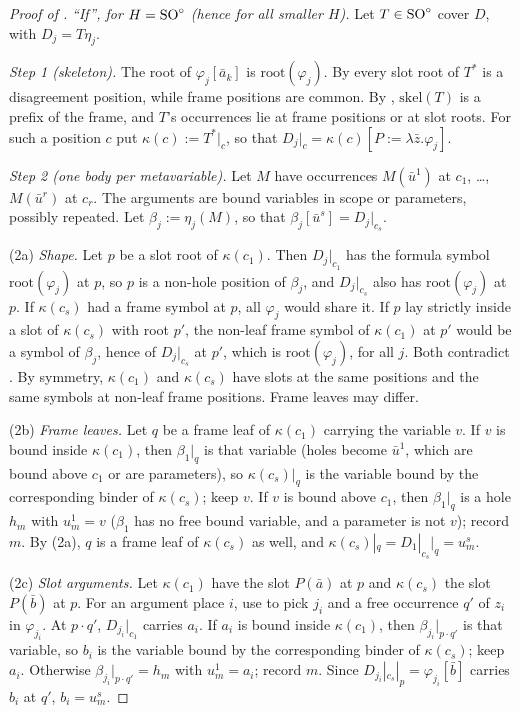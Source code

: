 \begin{proof}[Proof of ]
\emph{``If'', for $H=\mathrm{SO}^{\circ}$ (hence for all smaller $H$).} Let $T\in\mathrm{SO}^{\circ}$ cover $D$, with $D_j=T\eta_j$.

\emph{Step 1 (skeleton).} The root of $\varphi_j[\bar a_k]$ is $\mathrm{root}(\varphi_j)$. By \evR{} every slot root of
$T^*$ is a disagreement position, while frame positions are common. By , $\mathrm{skel}(T)$ is a
prefix of the frame, and $T$'s occurrences lie at frame positions or at slot roots. For such a position $c$ put
$\kappa(c):=T^*|_c$, so that $D_j|_c=\kappa(c)[P:=\lambda\bar z.\varphi_j]$.

\emph{Step 2 (one body per metavariable).} Let $M$ have occurrences $M(\bar u^1)$ at $c_1$, \dots, $M(\bar u^r)$ at
$c_r$. The arguments are bound variables in scope or parameters, possibly repeated. Let $\beta_j:=\eta_j(M)$, so that
$\beta_j[\bar u^s]=D_j|_{c_s}$.

(2a) \emph{Shape.} Let $p$ be a slot root of $\kappa(c_1)$. Then $D_j|_{c_1}$ has the formula symbol
$\mathrm{root}(\varphi_j)$ at $p$, so $p$ is a non-hole position of $\beta_j$, and $D_j|_{c_s}$ also has
$\mathrm{root}(\varphi_j)$ at $p$. If $\kappa(c_s)$ had a frame symbol at $p$, all $\varphi_j$ would share it. If $p$
lay strictly inside a slot of $\kappa(c_s)$ with root $p'$, the non-leaf frame symbol of $\kappa(c_1)$ at $p'$ would be a
symbol of $\beta_j$, hence of $D_j|_{c_s}$ at $p'$, which is $\mathrm{root}(\varphi_j)$, for all $j$. Both contradict
\evR. By symmetry, $\kappa(c_1)$ and $\kappa(c_s)$ have slots at the same positions and the same symbols at non-leaf
frame positions. Frame leaves may differ.

(2b) \emph{Frame leaves.} Let $q$ be a frame leaf of $\kappa(c_1)$ carrying the variable $v$. If $v$ is bound inside
$\kappa(c_1)$, then $\beta_1|_q$ is that variable (holes become $\bar u^1$, which are bound above $c_1$ or are
parameters), so $\kappa(c_s)|_q$ is the variable bound by the corresponding binder of $\kappa(c_s)$; keep $v$. If $v$ is
bound above $c_1$, then $\beta_1|_q$ is a hole $h_m$ with $u^1_m=v$ ($\beta_1$ has no free bound variable, and a
parameter is not $v$); record $m$. By (2a), $q$ is a frame leaf of $\kappa(c_s)$ as well, and
$\kappa(c_s)|_q=D_1|_{c_s}|_q=u^s_m$.

(2c) \emph{Slot arguments.} Let $\kappa(c_1)$ have the slot $P(\bar a)$ at $p$ and $\kappa(c_s)$ the slot $P(\bar b)$
at $p$. For an argument place $i$, use  to pick $j_i$ and a free occurrence $q'$ of $z_i$ in $\varphi_{j_i}$. At
$p\cdot q'$, $D_{j_i}|_{c_1}$ carries $a_i$. If $a_i$ is bound inside $\kappa(c_1)$, then $\beta_{j_i}|_{p\cdot q'}$ is
that variable, so $b_i$ is the variable bound by the corresponding binder of $\kappa(c_s)$; keep $a_i$. Otherwise
$\beta_{j_i}|_{p\cdot q'}=h_m$ with $u^1_m=a_i$; record $m$. Since $D_{j_i}|_{c_s}|_p=\varphi_{j_i}[\bar b]$ carries
$b_i$ at $q'$, $b_i=u^s_m$.


\end{proof}
